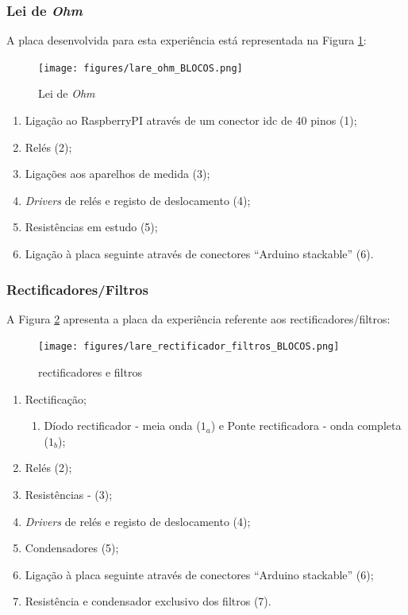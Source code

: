 \subsubsection{Lei de \textit{Ohm}}
A placa desenvolvida para esta experiência está representada na Figura \ref{fig:placaleideohm}:

\begin{figure}[hbtp]
	\centering
	\texttt{[image: figures/lare\_ohm\_BLOCOS.png]}
	\caption{ Lei de \textit{Ohm}}
	\label{fig:placaleideohm}
\end{figure}

\begin{enumerate}
	\item Ligação ao \gls{RaspberryPI} através de um conector \acrfull{idc} de 40 pinos (1);
	\item Relés (2);
	\item Ligações aos aparelhos de medida (3);
	\item \textit{Drivers} de relés e registo de deslocamento (4);
	\item Resistências em estudo (5);
	\item Ligação à placa seguinte através de conectores ``Arduino stackable'' (6).
\end{enumerate}

\subsubsection{Rectificadores/Filtros}
A Figura \ref{fig:placarectificadores} apresenta a placa da experiência referente aos rectificadores/filtros:

\begin{figure}[hbtp]
	\centering
	\texttt{[image: figures/lare\_rectificador\_filtros\_BLOCOS.png]}
	\caption{ rectificadores e filtros}
	\label{fig:placarectificadores}
\end{figure}

\begin{enumerate}
	\item Rectificação;
		\begin{enumerate}
			\item \label{diodos}Díodo rectificador - meia onda ($1_{a}$) e Ponte rectificadora - onda completa ($1_{b}$);	
		\end{enumerate}
    \item Relés (2);
    \item Resistências - (3);
  	\item \textit{Drivers} de relés e registo de deslocamento (4);
	\item Condensadores (5);
	\item Ligação à placa seguinte através de conectores ``Arduino stackable'' (6);
	\item Resistência e condensador exclusivo dos filtros (7).
\end{enumerate}


